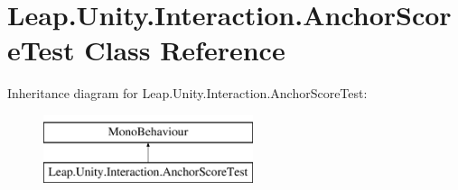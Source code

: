 \hypertarget{class_leap_1_1_unity_1_1_interaction_1_1_anchor_score_test}{}\section{Leap.\+Unity.\+Interaction.\+Anchor\+Score\+Test Class Reference}
\label{class_leap_1_1_unity_1_1_interaction_1_1_anchor_score_test}
Inheritance diagram for Leap.\+Unity.\+Interaction.\+Anchor\+Score\+Test\+:\begin{figure}[H]
\begin{center}
\leavevmode
\includegraphics[height=2.000000cm]{class_leap_1_1_unity_1_1_interaction_1_1_anchor_score_test}
\end{center}
\end{figure}
